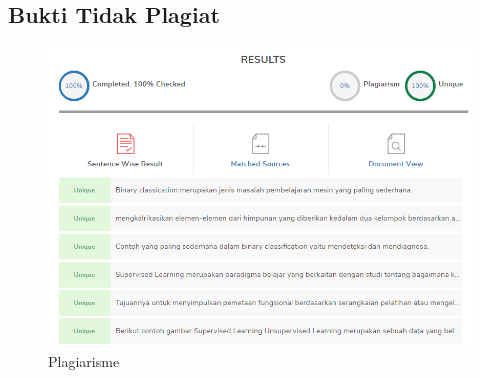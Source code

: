\subsection{Bukti Tidak Plagiat}
		\begin{figure}[H]
			\centering
			\includegraphics[width=1\textwidth]{figures/1174057/chapter2/plagiat.png}
			\caption{Plagiarisme}
			\label{print}
		\end{figure}


